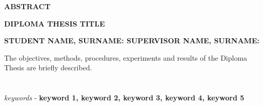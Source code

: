 \begin{center}  \Large{\textbf{ABSTRACT}}  \end{center}
\begin{center}  \Large{\textbf{DIPLOMA THESIS TITLE}}  \end{center}
\vspace{3pt}
\begin{center}  \large{\textbf{STUDENT NAME, SURNAME: \hspace{50pt} SUPERVISOR NAME, SURNAME:}}  \end{center}
\vspace{10pt}
\noindent
The objectives, methods, procedures, experiments and results of the Diploma Thesis are briefly described.\\\\
\noindent
\vspace{0.3cm}
\\ \textit{keywords} - \textbf{keyword 1, keyword 2, keyword 3, keyword 4, keyword 5} 